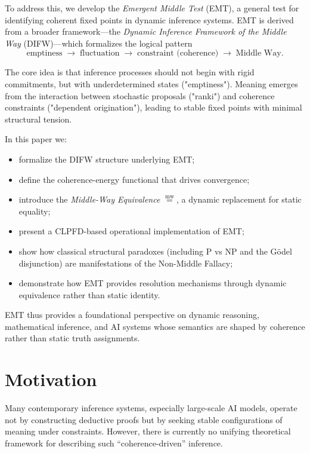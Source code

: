 \documentclass[11pt]{article}
\newcommand{\mweq}{\mathrel{\overset{\mathrm{mw}}{=}}}
\theoremstyle{definition}
\theoremstyle{remark}
\begin{document}
To address this, we develop the \emph{Emergent Middle Test}
(EMT), a general test for identifying coherent fixed points in
dynamic inference systems. EMT is derived from a broader
framework---the \emph{Dynamic Inference Framework of the
Middle Way} (DIFW)---which formalizes the logical pattern
\[
\text{emptiness} \;\longrightarrow\; \text{fluctuation} \;\longrightarrow\;
\text{constraint (coherence)} \;\longrightarrow\; \text{Middle Way}.
\]

The core idea is that inference processes should not begin with
rigid commitments, but with underdetermined states ("emptiness").
Meaning emerges from the interaction between stochastic proposals
("ranki") and coherence constraints ("dependent origination"),
leading to stable fixed points with minimal structural tension.

In this paper we:

\begin{itemize}
    \item formalize the DIFW structure underlying EMT;
    \item define the coherence-energy functional that drives
          convergence;
    \item introduce the \emph{Middle-Way Equivalence} $\mweq$,
          a dynamic replacement for static equality;
    \item present a CLPFD-based operational implementation of EMT;
    \item show how classical structural paradoxes (including P vs NP
          and the G\"odel disjunction) are manifestations of the
          Non-Middle Fallacy;
    \item demonstrate how EMT provides resolution mechanisms through
          dynamic equivalence rather than static identity.
\end{itemize}

EMT thus provides a foundational perspective on dynamic reasoning,
mathematical inference, and AI systems whose semantics are shaped
by coherence rather than static truth assignments.

\section{Motivation}

Many contemporary inference systems, especially large-scale AI
models, operate not by constructing deductive proofs but by
seeking stable configurations of meaning under constraints.
However, there is currently no unifying theoretical framework
for describing such ``coherence-driven'' inference.
\end{document}
